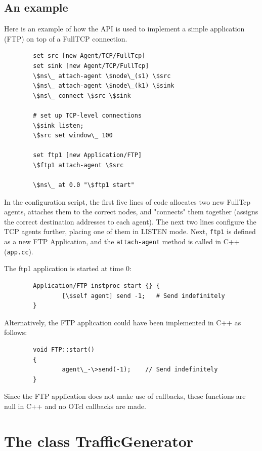 \subsection{An example}
\label{sec:syscallsexample}
Here is an example of how the API is used to implement a simple application
(FTP) on top of a FullTCP connection. 

\begin{verbatim}
        set src [new Agent/TCP/FullTcp]
        set sink [new Agent/TCP/FullTcp]
        \$ns\_ attach-agent \$node\_(s1) \$src
        \$ns\_ attach-agent \$node\_(k1) \$sink
        \$ns\_ connect \$src \$sink

        # set up TCP-level connections
        \$sink listen; 
        \$src set window\_ 100

        set ftp1 [new Application/FTP]
        \$ftp1 attach-agent \$src

        \$ns\_ at 0.0 "\$ftp1 start"
\end{verbatim}

In the configuration script, the first five lines of code allocates two new
FullTcp agents, attaches them to the correct nodes, and "connects" them
together (assigns the correct destination addresses to each agent).  The
next two lines configure the TCP agents further, placing one of them in
LISTEN mode.  Next, {\tt ftp1} is defined as a new FTP Application, and 
the {\tt attach-agent} method is called in C++ ({\tt app.cc}).     

The ftp1 application is started at time 0:
\begin{verbatim}
        Application/FTP instproc start {} {
      	        [\$self agent] send -1;   # Send indefinitely
        }
\end{verbatim}
Alternatively, the FTP application could have been implemented in C++ as
follows:
\begin{verbatim}
        void FTP::start()
        {
                agent\_-\>send(-1);    // Send indefinitely
        }
\end{verbatim}  
Since the FTP application does not make use of callbacks, these functions
are null in C++ and no OTcl callbacks are made. 

\section{The class TrafficGenerator}
\label{sec:trafgenclass}

